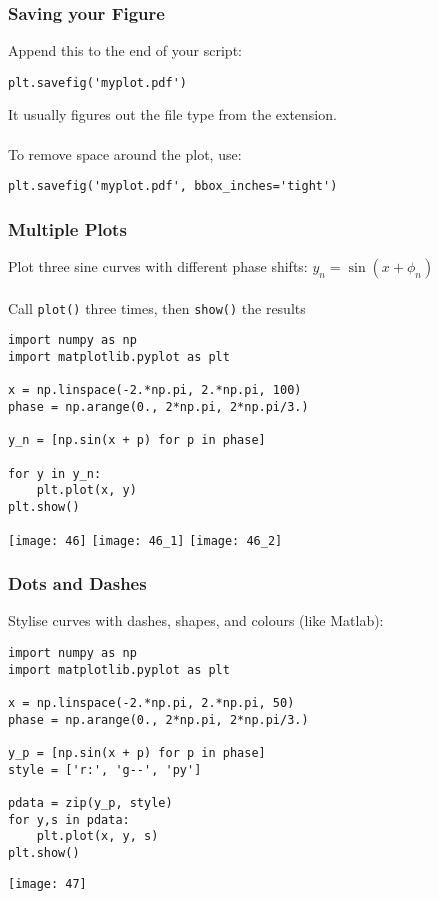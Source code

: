 \begin{frame}[fragile]\frametitle{Saving your Figure}

    Append this to the end of your script:
    \begin{lstlisting}
plt.savefig('myplot.pdf')
    \end{lstlisting}
    It usually figures out the file type from the extension.
    \\~\\
    To remove space around the plot, use:
    \begin{lstlisting}
plt.savefig('myplot.pdf', bbox_inches='tight')
    \end{lstlisting}

\end{frame}

\begin{frame}[fragile]\frametitle{Multiple Plots}

    Plot three sine curves with different phase shifts:
    $y_n = \sin(x + \phi_n)$
    \\~\\
    Call \lstinline|plot()| three times, then \lstinline|show()| the results
    \begin{lstlisting}
import numpy as np
import matplotlib.pyplot as plt

x = np.linspace(-2.*np.pi, 2.*np.pi, 100)
phase = np.arange(0., 2*np.pi, 2*np.pi/3.)

y_n = [np.sin(x + p) for p in phase]

for y in y_n:
    plt.plot(x, y)
plt.show()
    \end{lstlisting}
\begin{center}
\texttt{[image: 46]}
\texttt{[image: 46\_1]}
\texttt{[image: 46\_2]}
\end{center}
\end{frame}

\begin{frame}[fragile]\frametitle{Dots and Dashes}

    Stylise curves with dashes, shapes, and colours (like Matlab):
    \begin{lstlisting}
import numpy as np
import matplotlib.pyplot as plt

x = np.linspace(-2.*np.pi, 2.*np.pi, 50)
phase = np.arange(0., 2*np.pi, 2*np.pi/3.)

y_p = [np.sin(x + p) for p in phase]
style = ['r:', 'g--', 'py']

pdata = zip(y_p, style)
for y,s in pdata:
    plt.plot(x, y, s)
plt.show()
    \end{lstlisting}
\begin{center}
\texttt{[image: 47]}
\end{center}
\end{frame}

